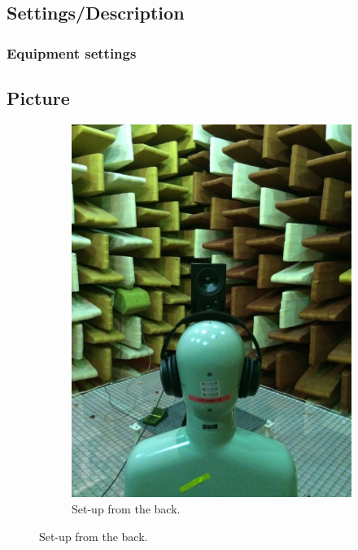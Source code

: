 \subsection{Settings/Description}
	\subsubsection{Equipment settings}
	
	
\subsection{Picture}
\begin{figure}[H]
	\centering
	\begin{subfigure}[b]{0.5\textwidth}
		\centering
		\includegraphics[width=\textwidth]{../Journal/Experiments/TestofConsumerHeadphones/Pictures/OtherBrandsSetupBack.jpg}
		\caption{Set-up from the back.}

\end{subfigure}
\end{figure}

